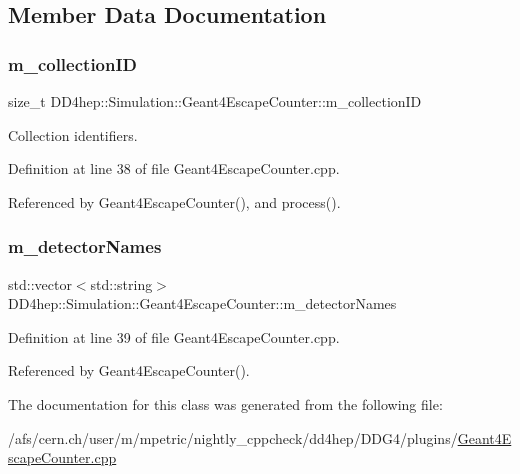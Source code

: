 \subsection{Member Data Documentation}
\hypertarget{class_d_d4hep_1_1_simulation_1_1_geant4_escape_counter_a4705f9b7bb31e8f42d05186889ec9729}{}\label{class_d_d4hep_1_1_simulation_1_1_geant4_escape_counter_a4705f9b7bb31e8f42d05186889ec9729} 
\subsubsection{\texorpdfstring{m\+\_\+collection\+ID}{m\_collectionID}}
{\footnotesize\ttfamily size\+\_\+t D\+D4hep\+::\+Simulation\+::\+Geant4\+Escape\+Counter\+::m\+\_\+collection\+ID\hspace{0.3cm}{\ttfamily [private]}}



Collection identifiers. 



Definition at line 38 of file Geant4\+Escape\+Counter.\+cpp.



Referenced by Geant4\+Escape\+Counter(), and process().

\hypertarget{class_d_d4hep_1_1_simulation_1_1_geant4_escape_counter_a64b874d036145e35f7ee6d77cfe11209}{}\label{class_d_d4hep_1_1_simulation_1_1_geant4_escape_counter_a64b874d036145e35f7ee6d77cfe11209} 
\subsubsection{\texorpdfstring{m\+\_\+detector\+Names}{m\_detectorNames}}
{\footnotesize\ttfamily std\+::vector$<$std\+::string$>$ D\+D4hep\+::\+Simulation\+::\+Geant4\+Escape\+Counter\+::m\+\_\+detector\+Names\hspace{0.3cm}{\ttfamily [private]}}



Definition at line 39 of file Geant4\+Escape\+Counter.\+cpp.



Referenced by Geant4\+Escape\+Counter().



The documentation for this class was generated from the following file\+:\begin{DoxyCompactItemize}
\item 
/afs/cern.\+ch/user/m/mpetric/nightly\+\_\+cppcheck/dd4hep/\+D\+D\+G4/plugins/\hyperlink{_geant4_escape_counter_8cpp}{Geant4\+Escape\+Counter.\+cpp}\end{DoxyCompactItemize}
